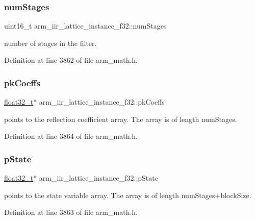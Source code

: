 \subsubsection{\texorpdfstring{num\+Stages}{numStages}}
{\footnotesize\ttfamily uint16\+\_\+t arm\+\_\+iir\+\_\+lattice\+\_\+instance\+\_\+f32\+::num\+Stages}

number of stages in the filter. 

Definition at line 3862 of file arm\+\_\+math.\+h.

\mbox{\label{structarm__iir__lattice__instance__f32_aa69fcdd3775e828d450ce1bbd978fa31}} 
\subsubsection{\texorpdfstring{pk\+Coeffs}{pkCoeffs}}
{\footnotesize\ttfamily \hyperlink{arm__math_8h_a4611b605e45ab401f02cab15c5e38715}{float32\+\_\+t}$\ast$ arm\+\_\+iir\+\_\+lattice\+\_\+instance\+\_\+f32\+::pk\+Coeffs}

points to the reflection coefficient array. The array is of length num\+Stages. 

Definition at line 3864 of file arm\+\_\+math.\+h.

\mbox{\label{structarm__iir__lattice__instance__f32_a30babe7815510219e6e3d28e6e4a5969}} 
\subsubsection{\texorpdfstring{p\+State}{pState}}
{\footnotesize\ttfamily \hyperlink{arm__math_8h_a4611b605e45ab401f02cab15c5e38715}{float32\+\_\+t}$\ast$ arm\+\_\+iir\+\_\+lattice\+\_\+instance\+\_\+f32\+::p\+State}

points to the state variable array. The array is of length num\+Stages+block\+Size. 

Definition at line 3863 of file arm\+\_\+math.\+h.

